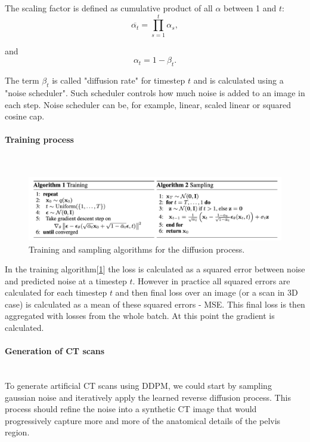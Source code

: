 The scaling factor is defined as cumulative product of all $\alpha$ between 1 and $t$:
\begin{equation}
    \overline{\alpha_t} = \prod_{s=1}^t \alpha_s,
\end{equation}

and 
\begin{equation}
    \alpha_t = 1-\beta_t.
\end{equation}

The term $\beta_t$ is called "diffusion rate" for timestep $t$ and is calculated using a "noise scheduler". Such scheduler controls how much noise is added to an image in each step. Noise scheduler can be, for example, linear, scaled linear or squared cosine cap.

\paragraph{Training process}\mbox{}\\

\begin{figure}[H]
    \centering
    \includegraphics[width=0.9\linewidth]{concept_engineering/ddpm/DDPM-algo.png}
    \caption{Training and sampling algorithms for the diffusion process\cite{ho2020denoisingdiffusionprobabilisticmodels}.}
    \label{fig:diffusion-algo}
\end{figure}
In the training algorithm[\ref{fig:diffusion-algo}] the loss is calculated as a squared error between noise and predicted noise at a timestep $t$. However in practice all squared errors are calculated for each timestep $t$ and then final loss over an image (or a scan in 3D case) is calculated as a mean of these squared errors - MSE. 
This final loss is then aggregated with losses from the whole batch. At this point the gradient is calculated.  

\paragraph{Generation of CT scans}\mbox{}\\
\indent To generate artificial CT scans using DDPM, we could start by sampling gaussian noise and iteratively apply the learned reverse diffusion process. This process should refine the noise into a synthetic CT image that would progressively capture more and more of the anatomical details of the pelvis region.


